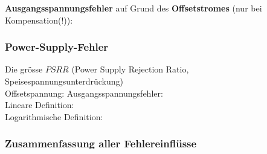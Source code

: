 			\begin{minipage}{18cm}
            	\vspace{3mm}
				\textbf{Ausgangsspannungsfehler} auf Grund des \textbf{Offsetstromes} (nur bei
				Kompensation(!)):
				\\
			\end{minipage}

		\subsubsection{Power-Supply-Fehler }
			\begin{minipage}{18cm}
            Die grösse $PSRR$ (Power Supply Rejection Ratio, Speisespannungsunterdrückung)\\
            Offsetspannung: 
            \hspace{10mm}
            Ausgangsspannungsfehler:
            \\
            Lineare Definition: \hspace{11mm}
            \\
            Logarithmische Definition:
            \\
            \end{minipage}

		\subsubsection{Zusammenfassung aller Fehlereinflüsse }
			\begin{minipage}{18cm}
            	\\
            \end{minipage}

